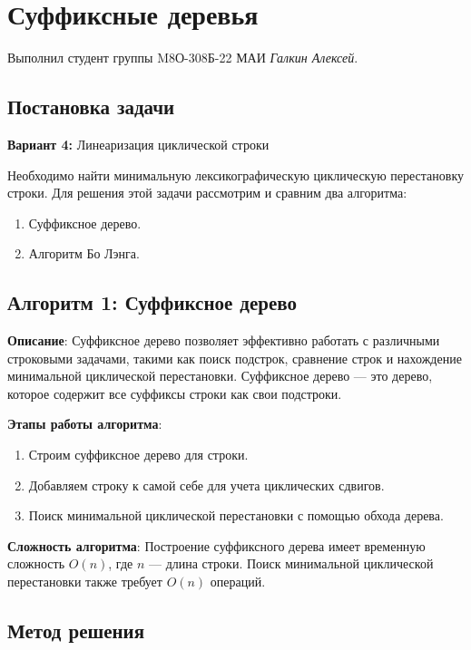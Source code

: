 \documentclass[12pt]{article}
\begin{document}
\section*{Суффиксные деревья}

\noindent Выполнил студент группы M8О-308Б-22 МАИ \textit{Галкин Алексей}.

\subsection*{Постановка задачи}

\textbf{Вариант 4:} Линеаризация циклической строки

\text Необходимо найти минимальную лексикографическую циклическую перестановку строки. Для решения этой задачи рассмотрим и сравним два алгоритма:
\begin{enumerate}
    \item Суффиксное дерево.
    \item Алгоритм Бо Лэнга.
\end{enumerate}


\subsection*{Алгоритм 1: Суффиксное дерево}

\textbf{Описание}: Суффиксное дерево позволяет эффективно работать с различными строковыми задачами, такими как поиск подстрок, сравнение строк и нахождение минимальной циклической перестановки. Суффиксное дерево — это дерево, которое содержит все суффиксы строки как свои подстроки.

\textbf{Этапы работы алгоритма}:
\begin{enumerate}
    \item Строим суффиксное дерево для строки.
    \item Добавляем строку к самой себе для учета циклических сдвигов.
    \item Поиск минимальной циклической перестановки с помощью обхода дерева.
\end{enumerate}

\textbf{Сложность алгоритма}: Построение суффиксного дерева имеет временную сложность $O(n)$, где $n$ — длина строки. Поиск минимальной циклической перестановки также требует $O(n)$ операций.
\subsection*{Метод решения}
\end{document}
